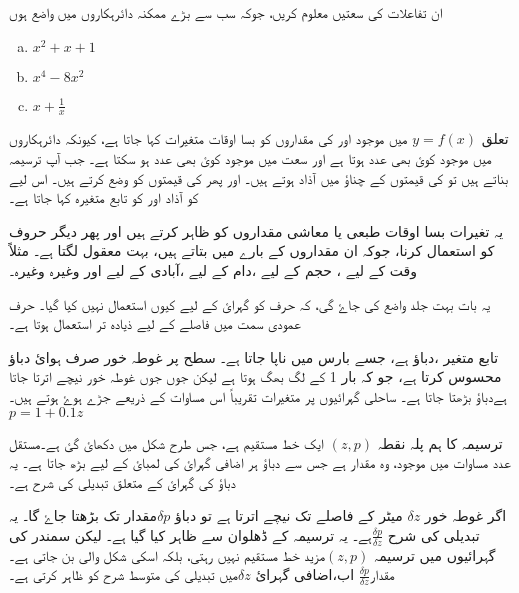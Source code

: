 ان تفاعلات کی سعتیں معلوم کریں، جوکہ سب سے بڑے ممکنہ دائرہکاروں میں واضع ہوں
\begin{multicols}{3}
\begin{enumerate}[a.]
\item \( x^{2}+x+1    \)
\item \( x^{4}-8x^{2}   \)
\item  \( x+\frac{1}{x}   \)
\end{enumerate}
\end{multicols}

تعلق 	 \(y=f(x)\)  	میں موجود		   اور  کی مقداروں کو بسا اوقات متغیرات کہا جاتا ہے، کیونکہ 	  دائرہکاروں میں موجود کوئ بھی عدد ہوتا ہے اور   سعت میں موجود کوئ بھی عدد ہو سکتا ہے۔ جب آپ ترسیمہ بناتے ہیں تو 	کی قیمتوں کے چناؤ میں آذاد ہوتے ہیں۔ اور پھر  کی قیمتوں کو وضع کرتے ہیں۔ اس لیے 	  	کو آذاد اور 	 	کو تابع متغیرہ کہا جاتا ہے۔

یہ تغیرات بسا اوقات طبعی یا معاشی مقداروں کو ظاہر کرتے ہیں اور پھر دیگر حروف کو استعمال کرنا، جوکہ ان مقداروں کے بارے میں بتاتے ہیں، بہت معقول لگتا ہے۔ مثلاً وقت کے لیے 	   	، حجم کے لیے    		،دام کے لیے 	   	،آبادی کے لیے 	   	اور وغیرہ وغیرہ۔

یہ بات بہت جلد واضع کی جاۓ گی، کہ حرف 	   	کو گہرائ کے لیے کیوں استعمال نہیں کیا گیا۔ حرف 		   عمودی سمت میں فاصلے کے لیے ذیادہ تر استعمال ہوتا ہے۔

تابع متغیر ،دباؤ 	   	ہے، جسے بارس میں ناپا جاتا ہے۔ سطح پر غوطہ خور صرف ہوائ دباؤ محسوس کرتا  ہے، جو کہ بار 1 کے لگ بھگ ہوتا ہے لیکن جوں جوں غوطہ خور نیچے اترتا جاتا ہےدباؤ بڑھتا جاتا ہے۔ ساحلی گہرائیوں پر متغیرات تقریباً اس مساوات کے ذریعے جڑے ہوۓ ہوتے ہیں۔\(p=1+0.1z\)

ترسیمہ کا ہم پلہ نقطہ 		\( (z,p)\)	ایک خط مستقیم ہے، جس طرح شکل   میں دکھائ گئ ہے۔مستقل عدد   مساوات میں موجود، وہ مقدار ہے جس سے دباؤ ہر اضافی گہرائ کی لمبائ کے لیے بڑھ جاتا ہے۔ یہ دباؤ کی گہرائ کے متعلق تبدیلی کی شرح ہے۔

اگر غوطہ خور 	\( \delta z   \)	میٹر کے فاصلے تک نیچے اترتا ہے تو دباؤ		\( \delta p   \)مقدار تک بڑھتا جاۓ گا۔ یہ تبدیلی کی شرح 		\( \frac{\delta p}{\delta z} \)ہے۔ یہ ترسیمہ کے ڈھلوان سے ظاہر کیا گیا ہے۔
لیکن سمندر کی گہرائیوں میں ترسیمہ \( (z,p)\)مزید خط مستقیم نہیں رہتی، بلکہ اسکی شکل     والی بن جاتی ہے۔مقدار\(\frac{\delta p}{\delta z} \) اب،اضافی گہرائ \( \delta z   \)میں تبدیلی کی متوسط شرح کو ظاہر کرتی ہے۔

